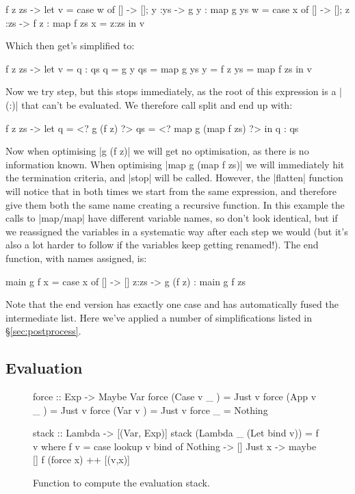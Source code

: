 \documentclass[draft]{sigplanconf}
\begin{document}
\begin{code}
\g f z zs ->
    let  v = case  w  of {[] -> []; y  :ys  -> g  y  : map g  ys  }
         w = case  x  of {[] -> []; z  :zs  -> f  z  : map f  zs  }
         x = z:zs
    in   v
\end{code}

Which then get's simplified to:

\begin{code}
\g f z zs ->  let  v = q : qs
                   q = g y
                   qs = map g ys
                   y = f z
                   ys = map f zs
              in   v
\end{code}

Now we try step, but this stops immediately, as the root of this expression is a |(:)| that can't be evaluated. We therefore call split and end up with:

\begin{code}
\g f z zs ->  let  q = <? g (f z) ?>
                   qs = <? map g (map f zs) ?>
              in   q : qs
\end{code}

Now when optimising |g (f z)| we will get no optimisation, as there is no information known. When optimising |map g (map f zs)| we will immediately hit the termination criteria, and |stop| will be called. However, the |flatten| function will notice that in both times we start from the same expression, and therefore give them both the same name creating a recursive function. In this example the calls to |map/map| have different variable names, so don't look identical, but if we reassigned the variables in a systematic way after each step we would (but it's also a lot harder to follow if the variables keep getting renamed!). The end function, with names assigned, is:

\begin{code}
main g f x = case x of
    [] -> []
    z:zs -> g (f z) : main g f zs
\end{code}

Note that the end version has exactly one case and has automatically fused the intermediate list. Here we've applied a number of simplifications listed in \S\ref{sec:postprocess}.

\subsection{Evaluation}
\label{sec:eval}

\begin{figure}
\begin{code}
force :: Exp -> Maybe Var
force (Case v _  ) = Just v
force (App v _   ) = Just v
force (Var v     ) = Just v
force _ = Nothing

stack :: Lambda -> [(Var, Exp)]
stack (Lambda _ (Let bind v)) = f v
    where f v = case  lookup v bind of
                      Nothing  -> []
                      Just x   -> maybe [] f (force x) ++ [(v,x)]
\end{code}
\caption{Function to compute the evaluation stack.}
\label{fig:stack}
\end{figure}
\end{document}
